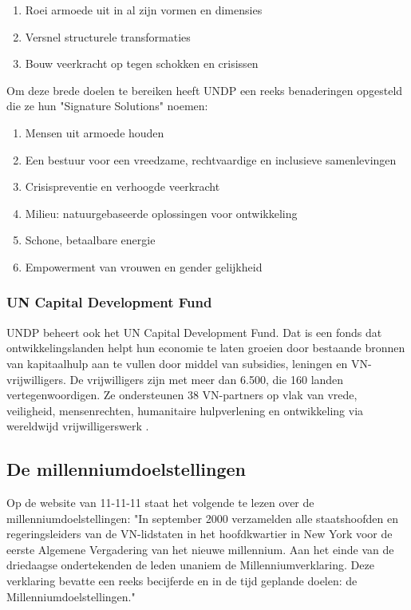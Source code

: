 \begin{enumerate}
\item Roei armoede uit in al zijn vormen en dimensies
\item Versnel structurele transformaties
\item Bouw veerkracht op tegen schokken en crisissen
\end{enumerate}

Om deze brede doelen te bereiken heeft UNDP een reeks benaderingen opgesteld die ze hun "Signature Solutions" noemen:

\begin{enumerate}
	\item Mensen uit armoede houden
	\item Een bestuur voor een vreedzame, rechtvaardige en inclusieve samenlevingen
	\item Crisispreventie en verhoogde veerkracht
	\item Milieu: natuurgebaseerde oplossingen voor ontwikkeling
	\item Schone, betaalbare energie
	\item Empowerment van vrouwen en gender gelijkheid
\end{enumerate}

\subsubsection{UN Capital Development Fund}
UNDP beheert ook het UN Capital Development Fund. Dat is een fonds dat ontwikkelingslanden helpt hun economie te laten groeien door bestaande bronnen van kapitaalhulp aan te vullen door middel van subsidies, leningen en VN-vrijwilligers. De vrijwilligers zijn met meer dan 6.500, die 160 landen vertegenwoordigen. Ze ondersteunen 38 VN-partners op vlak van vrede, veiligheid, mensenrechten, humanitaire hulpverlening en ontwikkeling via wereldwijd vrijwilligerswerk \autocite{DevelopmentProgram2020}.

\subsection{De millenniumdoelstellingen}
Op de website van 11-11-11 staat het volgende te lezen over de millenniumdoelstellingen: "In september 2000 verzamelden alle staatshoofden en regeringsleiders van de VN-lidstaten in het hoofdkwartier in New York voor de eerste Algemene Vergadering van het nieuwe millennium. Aan het einde van de driedaagse ondertekenden de leden unaniem de Millenniumverklaring. Deze verklaring bevatte een reeks becijferde en in de tijd geplande doelen: de Millenniumdoelstellingen." \autocite{11.11.112019}

